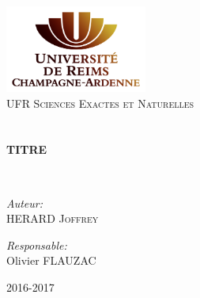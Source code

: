 \begin{titlepage}
\begin{center}

\includegraphics[width=0.35\textwidth]{./logo}~\\[1cm]

\textsc{\LARGE UFR Sciences Exactes et Naturelles}\\[1.5cm]

\textsc{\Large }\\[0.5cm]

\HRule \\[0.4cm]

{\huge \bfseries  
TITRE\\[0.4cm] }

\HRule \\[1.5cm]

\begin{minipage}{0.4\textwidth}
\begin{flushleft} \large
\emph{Auteur:}\\
HERARD \textsc{Joffrey}\\
\end{flushleft}
\end{minipage}
\begin{minipage}{0.4\textwidth}
\begin{flushright} \large
\emph{Responsable:} \\
Olivier \textsc{FLAUZAC}\\
\end{flushright}
\end{minipage}

\vfill

{\large 2016-2017}

\end{center}
\end{titlepage}
